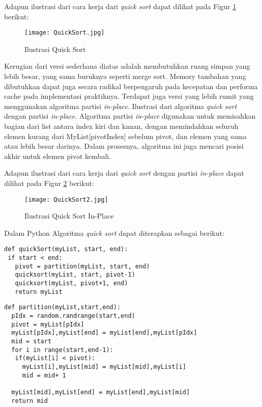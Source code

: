 \documentclass[12pt]{book}%
\begin{document}
\newpage{}
Adapun ilustrasi dari cara kerja dari \textit{quick sort} dapat dilihat pada Figur \ref{fig:Quick Sort Ilustration} berikut:

\begin{figure}[htbp]
\begin{center}
	\texttt{[image: QuickSort.jpg]}%
	\caption{Ilustrasi Quick Sort}%
	\label{fig:Quick Sort Ilustration}%
\end{center}
\end{figure}

Kerugian dari versi sederhana diatas adalah membutuhkan ruang simpan yang lebih besar, yang sama buruknya seperti merge sort. Memory tambahan yang dibutuhkan dapat juga secara radikal berpengaruh pada kecepatan dan performa cache pada implementasi praktiknya. Terdapat juga versi yang lebih rumit yang menggunakan algoritma partisi \textit{in-place}. Ilustrasi dari algoritma \textit{quick sort} dengan partisi \textit{in-place}. Algoritma partisi \textit{in-place} digunakan untuk memisahkan bagian dari list antara index kiri dan kanan, dengan memindahkan seluruh elemen kurang dari MyList[pivotIndex] sebelum pivot, dan elemen yang sama atau lebih besar darinya. Dalam prosesnya, algoritma ini juga mencari posisi akhir untuk elemen pivot kembali. 


Adapun ilustrasi dari cara kerja dari \textit{quick sort} dengan partisi \textit{in-place} dapat dilihat pada Figur \ref{fig:Quick Sort Ilustration 2} berikut:

\begin{figure}[htbp]
\begin{center}
	\texttt{[image: QuickSort2.jpg]}%
	\caption{Ilustrasi Quick Sort In-Place}%
	\label{fig:Quick Sort Ilustration 2}%
\end{center}
\end{figure}

\newpage{}
Dalam Python Algoritma \textit{quick sort} dapat diterapkan sebagai berikut:
\lstset{language=Python}
\label{lst:QuickSort}
\begin{lstlisting}[frame=single]
def quickSort(myList, start, end):
 if start < end:
   pivot = partition(myList, start, end)
   quicksort(myList, start, pivot-1)
   quicksort(myList, pivot+1, end)
   return myList
\end{lstlisting}

\lstset{language=Python}
\label{lst:Partition}
\begin{lstlisting}[frame=single]
def partition(myList,start,end):
  pIdx = random.randrange(start,end)
  pivot = myList[pIdx]
  myList[pIdx],myList[end] = myList[end],myList[pIdx]
  mid = start
  for i in range(start,end-1):
   if(myList[i] < pivot):    
	 myList[i],myList[mid] = myList[mid],myList[i]
	 mid = mid+ 1
	
  myList[mid],myList[end] = myList[end],myList[mid]
  return mid
\end{lstlisting}
\end{document}
